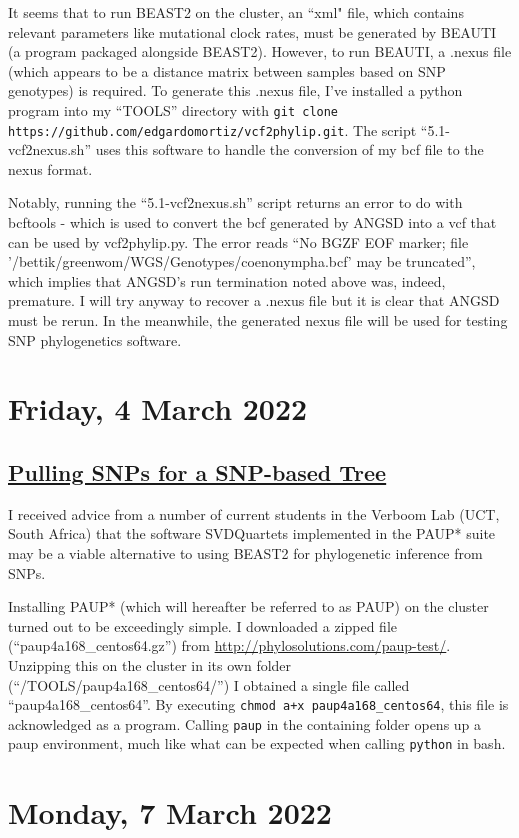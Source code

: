 \documentclass[12pt]{report}
\begin{document}
It seems that to run BEAST2 on the cluster, an ``xml" file, which contains relevant parameters like mutational clock rates, must be generated by BEAUTI (a program packaged alongside BEAST2). However, to run BEAUTI, a .nexus file (which appears to be a distance matrix between samples based on SNP genotypes) is required. To generate this .nexus file, I've installed a python program into my ``TOOLS'' directory with \verb!git clone https://github.com/edgardomortiz/vcf2phylip.git!. The script ``5.1-vcf2nexus.sh'' uses this software to handle the conversion of my bcf file to the nexus format.

Notably, running the ``5.1-vcf2nexus.sh'' script returns an error to do with bcftools - which is used to convert the bcf generated by ANGSD into a vcf that can be used by vcf2phylip.py. The error reads ``No BGZF EOF marker; file '/bettik/greenwom/WGS/Genotypes/coenonympha.bcf' may be truncated'', which implies that ANGSD's run termination noted above was, indeed, premature. I will try anyway to recover a .nexus file but it is clear that ANGSD must be rerun. In the meanwhile, the generated nexus file will be used for testing SNP phylogenetics software.

\section*{Friday, 4 March 2022}
\subsection*{\underline{Pulling SNPs for a SNP-based Tree}}

I received advice from a number of current students in the Verboom Lab (UCT, South Africa) that the software SVDQuartets implemented in the PAUP* suite may be a viable alternative to using BEAST2 for phylogenetic inference from SNPs.

Installing PAUP* (which will hereafter be referred to as PAUP) on the cluster turned out to be exceedingly simple. I downloaded a zipped file (``paup4a168\_centos64.gz'') from \url{http://phylosolutions.com/paup-test/}. Unzipping this on the cluster in its own folder (``/TOOLS/paup4a168\_centos64/'') I obtained a single file called ``paup4a168\_centos64''. By executing \verb!chmod a+x paup4a168_centos64!, this file is acknowledged as a program. Calling \verb!paup! in the containing folder opens up a paup environment, much like what can be expected when calling \verb!python! in bash.

\section*{Monday, 7 March 2022}
\end{document}

